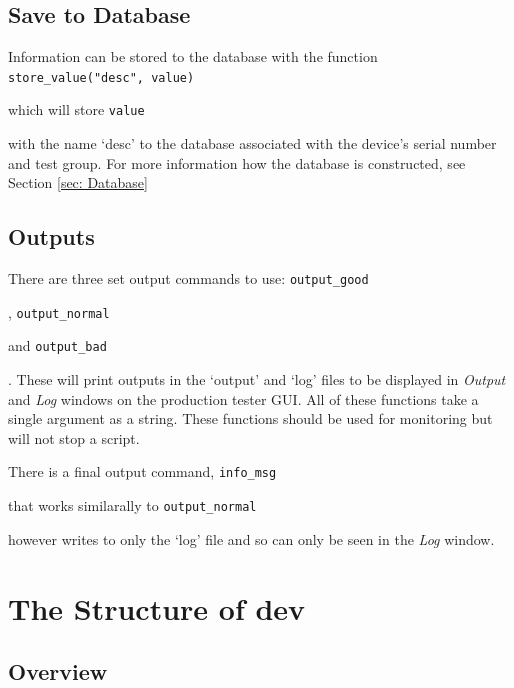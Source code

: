 \documentclass[a4paper,12pt, notitlepage]{article}
\begin{document}
{{{{\subsection{Save to Database}
\label{ssec: globalsDatabase}

Information can be stored to the database with the function \lstinline{store_value("desc", value)}{ which will store \lstinline{value}{ with the name `desc' to the database associated with the device's serial number and test group. For more information how the database is constructed, see Section \ref{sec: Database}

\subsection{Outputs}
\label{ssec: globalsOutputs}

There are three set output commands to use: \lstinline{output_good}{, \lstinline{output_normal}{ and \lstinline{output_bad}{. These will print outputs in the `output' and `log' files to be displayed in \textit{Output} and \textit{Log} windows on the production tester GUI. All of these functions take a single argument as a string. These functions should be used for monitoring but will not stop a script.

There is a final output command, \lstinline{info_msg}{ that works similarally to \lstinline{output_normal}{ however writes to only the `log' file and so can only be seen in the \textit{Log} window.


\newpage
\section{The Structure of dev}
\label{sec: examplehw}

\subsection{Overview}
\label{ssec: examplehwOverview}

}}}}}}}}}}}
\end{document}
